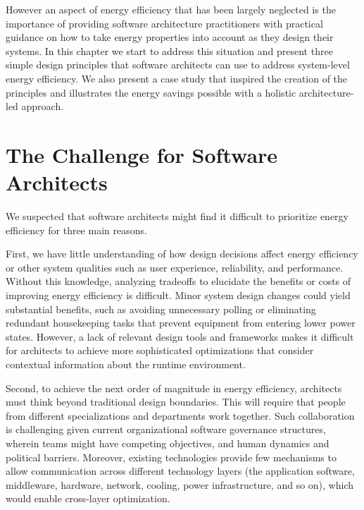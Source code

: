 However an aspect of energy efficiency that has been largely neglected is the importance of providing software architecture practitioners with practical guidance on how to take energy properties into account as they design their systems.  In this chapter we start to address this situation and present three simple design principles that software architects can use to address system-level energy efficiency. We also present a case study that inspired the creation of the principles and illustrates the energy savings possible with a holistic architecture-led approach.

\section{The Challenge for Software Architects}

We suspected that software architects might find it difficult to prioritize energy efficiency for three main reasons. 

First, we have little understanding of how design decisions affect energy efficiency or other system qualities such as user experience, reliability, and performance. Without this knowledge, analyzing tradeoffs to elucidate the benefits or costs of improving energy efficiency is difficult. Minor system design changes could yield substantial benefits, such as avoiding unnecessary polling or eliminating redundant housekeeping tasks that prevent equipment from entering lower power states. However, a lack of relevant design tools and frameworks makes it difficult for architects to achieve more sophisticated optimizations that consider contextual information about the runtime environment.

Second, to achieve the next order of magnitude in energy efficiency, architects must think beyond traditional design boundaries. This will require that people from different specializations and departments work together. Such collaboration is challenging given current organizational software governance structures, wherein teams might have competing objectives, and human dynamics and political barriers. Moreover, existing technologies provide few mechanisms to allow communication across different technology layers (the application software, middleware, hardware, network, cooling, power infrastructure, and so on), which would enable cross-layer optimization.

